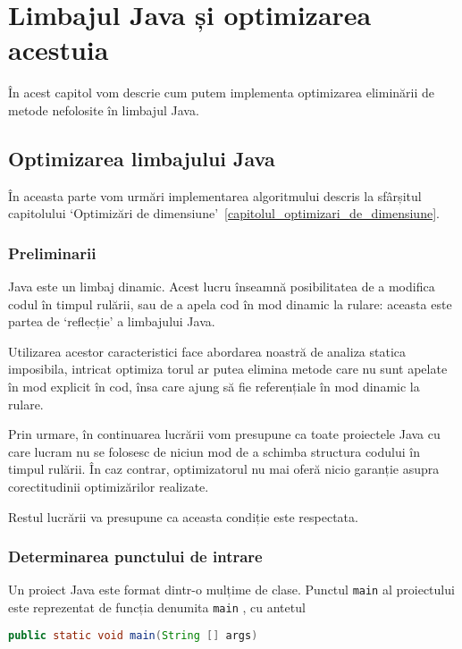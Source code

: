 \chapter{Limbajul Java și optimizarea acestuia}

În acest capitol vom descrie cum putem implementa optimizarea
eliminării de metode nefolosite în limbajul Java.

\section{Optimizarea limbajului Java}

În aceasta parte vom urmări implementarea algoritmului descris la sfârșitul
capitolului `Optimizări de dimensiune'~\ref{capitolul_optimizari_de_dimensiune}.

\subsection{Preliminarii}

Java este un limbaj dinamic. Acest lucru înseamnă posibilitatea de a modifica
codul în timpul rulării, sau de a apela cod în mod dinamic la rulare: aceasta
este partea de `reflecție' a limbajului Java.

Utilizarea acestor caracteristici face abordarea noastră de analiza
statica imposibila, intricat optimiza torul ar putea elimina metode care nu sunt
apelate în mod explicit în cod, însa care ajung să fie referențiale în mod
dinamic la rulare.

Prin urmare, în continuarea lucrării vom presupune ca toate proiectele Java cu
care lucram nu se folosesc de niciun mod de a schimba structura codului în
timpul rulării. În caz contrar, optimizatorul nu mai oferă nicio garanție asupra
corectitudinii optimizărilor realizate.

Restul lucrării va presupune ca aceasta condiție este respectata.

\subsection{Determinarea punctului de intrare}

Un proiect Java este format dintr-o mulțime de clase.
Punctul \texttt{main} al proiectului este reprezentat de funcția
denumita \texttt{main} \cite{java_main}, cu antetul

\begin{lstlisting}[language=Java]
public static void main(String [] args)
\end{lstlisting}


